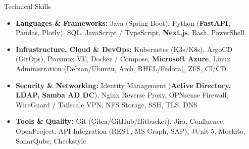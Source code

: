 \documentclass[]{mcdowellcv}
\begin{document}
    \newpage 

    \begin{cvsection}{Technical Skills}
        \begin{cvsubsection}{}{}{}
            \begin{itemize}
                \item \textbf{Languages \& Frameworks:} Java (Spring Boot), Python (\textbf{FastAPI}, Pandas, Plotly), SQL, JavaScript / TypeScript, \textbf{Next.js}, Bash, PowerShell
                \item \textbf{Infrastructure, Cloud \& DevOps:} Kubernetes (K3s/K8s), ArgoCD (GitOps), Proxmox VE, Docker / Compose, \textbf{Microsoft Azure}, Linux Administration (Debian/Ubuntu, Arch, RHEL/Fedora), ZFS, CI/CD
                \item \textbf{Security \& Networking:} Identity Management (\textbf{Active Directory, LDAP, Samba AD DC}), Nginx Reverse Proxy, OPNsense Firewall, WireGuard / Tailscale VPN, NFS Storage, SSH, TLS, DNS
                \item \textbf{Tools \& Quality:} Git (Gitea/GitHub/Bitbucket), Jira, Confluence, OpenProject, API Integration (REST, MS Graph, SAP), JUnit 5, Mockito, SonarQube, Checkstyle
            \end{itemize}
        \end{cvsubsection}
    \end{cvsection}

    \vspace{0.25cm}
\end{document}
